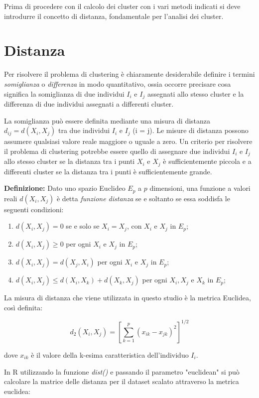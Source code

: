 Prima di procedere con il calcolo dei cluster con i vari metodi indicati si deve introdurre il concetto di distanza, fondamentale per l'analisi dei cluster.

\section{Distanza}\label{cap5.1}

Per risolvere il problema di clustering è chiaramente desiderabile definire i termini \textit{somiglianza} o \textit{differenza} in modo quantitativo, ossia occorre precisare cosa significa la somiglianza di due individui $I_i$ e $I_j$ assegnati allo stesso cluster e la differenza di due individui assegnati a differenti cluster.

La somiglianza può essere definita mediante una misura di distanza $d_{ij} = d(X_i, X_j)$ tra due individui $I_i$ e $I_j$ (i = j). Le misure di distanza possono assumere qualsiasi valore reale maggiore o uguale a zero. Un criterio per risolvere il problema di clustering potrebbe essere quello di assegnare due individui $I_i$ e $I_j$ allo stesso cluster se la distanza tra i punti $X_i$ e $X_j$ è sufficientemente piccola e a differenti cluster se la distanza tra i punti è sufficientemente grande.

\noindent \textbf{Definizione:} Dato uno spazio Euclideo $E_p$ a $p$ dimensioni, una funzione a valori reali $d(X_i, X_j)$ è detta \textit{funzione distanza} se e soltanto se essa soddisfa le seguenti condizioni:

\begin{enumerate}
    \item $d(X_i, X_j) = 0$ se e solo se $X_i = X_j$, con $X_i$ e $X_j$ in $E_p$;
    \item $d(X_i, X_j) \geq 0$ per ogni $X_i$ e $X_j$ in $E_p$;
    \item $d(X_i, X_j) = d(X_j, X_i)$ per ogni $X_i$ e $X_j$ in $E_p$;
    \item $d(X_i, X_j) \leq d(X_i, X_k) + d(X_k, X_j)$ per ogni $X_i, X_j$ e $X_k$ in $E_p$;
\end{enumerate}

La misura di distanza che viene utilizzata in questo studio è la metrica Euclidea, così definita:

\[d_2 (X_i, X_j) = \left[ \sum_{k=1}^p (x_{ik} - x_{jk})^2\right]^{1/2}  \]

dove $x_{ik}$ è il valore della k-esima caratteristica dell'individuo $I_i$.

In R utilizzando la funzione \textit{dist()} e passando il parametro "euclidean" si può calcolare la matrice delle distanza per il dataset scalato attraverso la metrica euclidea:

